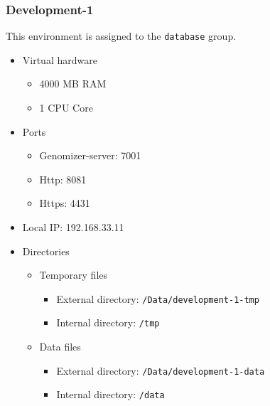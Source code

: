\subsubsection{Development-1}\label{development-1}

This environment is assigned to the \texttt{database} group.

\begin{itemize}
\itemsep1pt\parskip0pt
\item
  Virtual hardware

  \begin{itemize}
  \itemsep1pt\parskip0pt
  \item
    4000 MB RAM
  \item
    1 CPU Core
  \end{itemize}
\item
  Ports

  \begin{itemize}
  \itemsep1pt\parskip0pt
  \item
    Genomizer-server: 7001
  \item
    Http: 8081
  \item
    Https: 4431
  \end{itemize}
\item
  Local IP: 192.168.33.11
\item
  Directories

  \begin{itemize}
  \itemsep1pt\parskip0pt
  \item
    Temporary files

    \begin{itemize}
    \itemsep1pt\parskip0pt
    \item
      External directory: \texttt{/Data/development-1-tmp}
    \item
      Internal directory: \texttt{/tmp}
    \end{itemize}
  \item
    Data files

    \begin{itemize}
    \itemsep1pt\parskip0pt
    \item
      External directory: \texttt{/Data/development-1-data}
    \item
      Internal directory: \texttt{/data}
    \end{itemize}
  \end{itemize}
\end{itemize}

